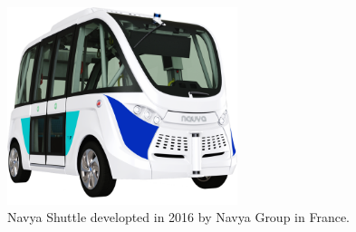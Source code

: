 \begin{figure}[!h]
	\centering
	\includegraphics[width=0.6\textwidth]{./figure/veiculos5.png}
	\caption{Navya Shuttle developted in 2016 by Navya Group in France.}
	\label{fig:veiculos5}
\end{figure}

